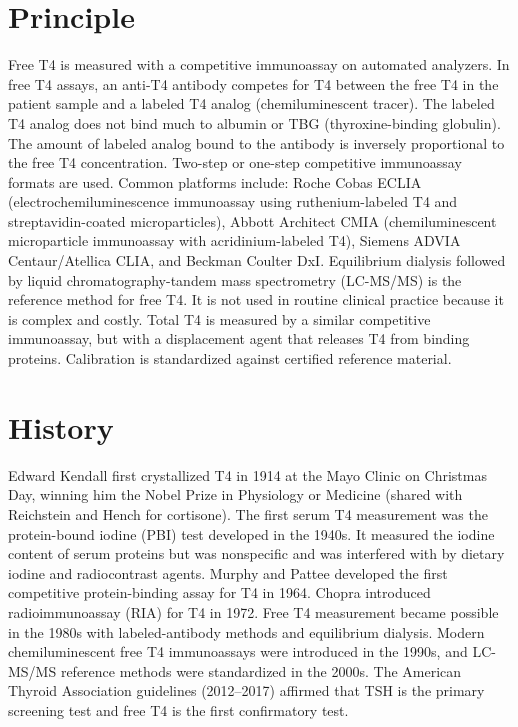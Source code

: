 \section*{Principle}
Free T4 is measured with a competitive immunoassay on automated analyzers. In free T4 assays, an anti-T4 antibody competes for T4 between the free T4 in the patient sample and a labeled T4 analog (chemiluminescent tracer). The labeled T4 analog does not bind much to albumin or TBG (thyroxine-binding globulin). The amount of labeled analog bound to the antibody is inversely proportional to the free T4 concentration. Two-step or one-step competitive immunoassay formats are used. Common platforms include: Roche Cobas ECLIA (electrochemiluminescence immunoassay using ruthenium-labeled T4 and streptavidin-coated microparticles), Abbott Architect CMIA (chemiluminescent microparticle immunoassay with acridinium-labeled T4), Siemens ADVIA Centaur/Atellica CLIA, and Beckman Coulter DxI. Equilibrium dialysis followed by liquid chromatography-tandem mass spectrometry (LC-MS/MS) is the reference method for free T4. It is not used in routine clinical practice because it is complex and costly. Total T4 is measured by a similar competitive immunoassay, but with a displacement agent that releases T4 from binding proteins. Calibration is standardized against certified reference material.

\section*{History}
Edward Kendall first crystallized T4 in 1914 at the Mayo Clinic on Christmas Day, winning him the Nobel Prize in Physiology or Medicine (shared with Reichstein and Hench for cortisone). The first serum T4 measurement was the protein-bound iodine (PBI) test developed in the 1940s. It measured the iodine content of serum proteins but was nonspecific and was interfered with by dietary iodine and radiocontrast agents. Murphy and Pattee developed the first competitive protein-binding assay for T4 in 1964. Chopra introduced radioimmunoassay (RIA) for T4 in 1972. Free T4 measurement became possible in the 1980s with labeled-antibody methods and equilibrium dialysis. Modern chemiluminescent free T4 immunoassays were introduced in the 1990s, and LC-MS/MS reference methods were standardized in the 2000s. The American Thyroid Association guidelines (2012--2017) affirmed that TSH is the primary screening test and free T4 is the first confirmatory test.

